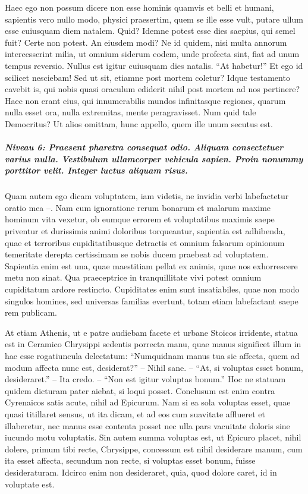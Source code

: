 \documentclass[twoside]{extreport}
\begin{document}
Haec ego non possum dicere non esse hominis quamvis et belli et humani,
sapientis vero nullo modo, physici praesertim, quem se ille esse vult,
putare ullum esse cuiusquam diem natalem. Quid? Idemne potest esse dies
saepius, qui semel fuit? Certe non potest. An eiusdem modi? Ne id
quidem, nisi multa annorum intercesserint milia, ut omnium siderum
eodem, unde profecta sint, fiat ad unum tempus reversio. Nullus est
igitur cuiusquam dies natalis. ``At habetur!'' Et ego id scilicet
nesciebam! Sed ut sit, etiamne post mortem coletur? Idque testamento
cavebit is, qui nobis quasi oraculum ediderit nihil post mortem ad nos
pertinere? Haec non erant eius, qui innumerabilis mundos infinitasque
regiones, quarum nulla esset ora, nulla extremitas, mente peragravisset.
Num quid tale Democritus? Ut alios omittam, hunc appello, quem ille unum
secutus est.

\hypertarget{niveau-6-praesent-pharetra-consequat-odio.-aliquam-consectetuer-varius-nulla.-vestibulum-ullamcorper-vehicula-sapien.-proin-nonummy-porttitor-velit.-integer-luctus-aliquam-risus.}{%
\subparagraph{Niveau 6: Praesent pharetra consequat odio. Aliquam
consectetuer varius nulla. Vestibulum ullamcorper vehicula sapien. Proin
nonummy porttitor velit. Integer luctus aliquam
risus.}\label{niveau-6-praesent-pharetra-consequat-odio.-aliquam-consectetuer-varius-nulla.-vestibulum-ullamcorper-vehicula-sapien.-proin-nonummy-porttitor-velit.-integer-luctus-aliquam-risus.}}

Quam autem ego dicam voluptatem, iam videtis, ne invidia verbi
labefactetur oratio mea --. Nam cum ignoratione rerum bonarum et malarum
maxime hominum vita vexetur, ob eumque errorem et voluptatibus maximis
saepe priventur et durissimis animi doloribus torqueantur, sapientia est
adhibenda, quae et terroribus cupiditatibusque detractis et omnium
falsarum opinionum temeritate derepta certissimam se nobis ducem
praebeat ad voluptatem. Sapientia enim est una, quae maestitiam pellat
ex animis, quae nos exhorrescere metu non sinat. Qua praeceptrice in
tranquillitate vivi potest omnium cupiditatum ardore restincto.
Cupiditates enim sunt insatiabiles, quae non modo singulos homines, sed
universas familias evertunt, totam etiam labefactant saepe rem publicam.

At etiam Athenis, ut e patre audiebam facete et urbane Stoicos
irridente, statua est in Ceramico Chrysippi sedentis porrecta manu, quae
manus significet illum in hae esse rogatiuncula delectatum: ``Numquidnam
manus tua sic affecta, quem ad modum affecta nunc est, desiderat?'' --
Nihil sane. -- ``At, si voluptas esset bonum, desideraret.'' -- Ita
credo. -- ``Non est igitur voluptas bonum.'' Hoc ne statuam quidem
dicturam pater aiebat, si loqui posset. Conclusum est enim contra
Cyrenaicos satis acute, nihil ad Epicurum. Nam si ea sola voluptas
esset, quae quasi titillaret sensus, ut ita dicam, et ad eos cum
suavitate afflueret et illaberetur, nec manus esse contenta posset nec
ulla pars vacuitate doloris sine iucundo motu voluptatis. Sin autem
summa voluptas est, ut Epicuro placet, nihil dolere, primum tibi recte,
Chrysippe, concessum est nihil desiderare manum, cum ita esset affecta,
secundum non recte, si voluptas esset bonum, fuisse desideraturam.
Idcirco enim non desideraret, quia, quod dolore caret, id in voluptate
est.
\end{document}

